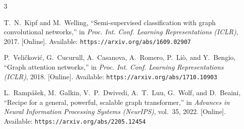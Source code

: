 \documentclass[conference]{IEEEtran}
\begin{document}
\begin{thebibliography}{3}

T.~N.~Kipf and M.~Welling,
``Semi-supervised classification with graph convolutional networks,''
in \textit{Proc. Int. Conf. Learning Representations (ICLR)}, 2017.
[Online]. Available: \texttt{https://arxiv.org/abs/1609.02907}

P.~Veli\v{c}kovi\'{c}, G.~Cucurull, A.~Casanova, A.~Romero, P.~Li\`{o},
and Y.~Bengio,
``Graph attention networks,''
in \textit{Proc. Int. Conf. Learning Representations (ICLR)}, 2018.
[Online]. Available: \texttt{https://arxiv.org/abs/1710.10903}

L.~Ramp\'{a}\v{s}ek, M.~Galkin, V.~P.~Dwivedi, A.~T.~Luu, G.~Wolf,
and D.~Beaini,
``Recipe for a general, powerful, scalable graph transformer,''
in \textit{Advances in Neural Information Processing Systems (NeurIPS)},
vol.~35, 2022.
[Online]. Available: \texttt{https://arxiv.org/abs/2205.12454}

\end{thebibliography}
\end{document}
